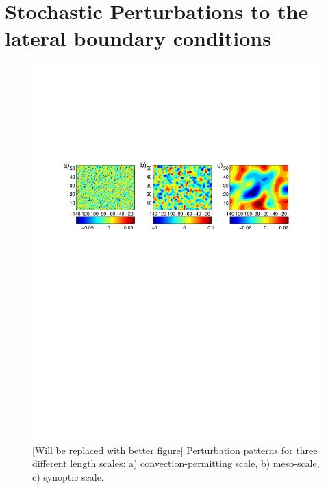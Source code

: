 \nocite{ Be11, Be15, Be09, Bo08, Bu99, Ha11, berner2017stochastic, jankov2017performance, leutbecher2017stochastic}

\section {Stochastic Perturbations to the lateral boundary conditions}
\begin{figure}[h!]
  \includegraphics[trim=0cm 15cm 0 10cm,scale=.80]{figures/stoch_pattern.png}
    \caption{ [Will be replaced with better figure]
    Perturbation patterns for three different length scales: a) convection-permitting scale, 
    b) meso-scale, c) synoptic scale.  
    }
  \label{fig_stoch_pattern}
\end{figure}
